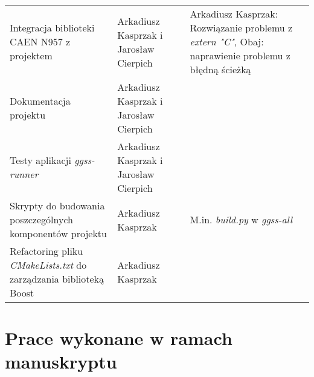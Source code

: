 \documentclass[12pt] {article}
\begin{document}
\newpage

\begin{table*}[htbp]
\centering
\begin{tabularx}{\textwidth}{@{}XXX@{}}

Integracja biblioteki CAEN N957 z projektem & Arkadiusz Kasprzak i Jarosław Cierpich & Arkadiusz Kasprzak: Rozwiązanie problemu z \textit{extern "{}C"}, Obaj: naprawienie problemu z błędną ścieżką \\
Dokumentacja projektu & Arkadiusz Kasprzak i Jarosław Cierpich & \\
Testy aplikacji \textit{ggss-runner} & Arkadiusz Kasprzak i Jarosław Cierpich & \\
Skrypty do budowania poszczególnych komponentów projektu & Arkadiusz Kasprzak & M.in. \textit{build.py} w \textit{ggss-all} \\
Refactoring pliku \textit{CMakeLists.txt} do zarządzania biblioteką Boost & Arkadiusz Kasprzak & \\





\bottomrule
\end{tabularx}
\end{table*}


\newpage

\section {Prace wykonane w ramach manuskryptu}
\end{document}
